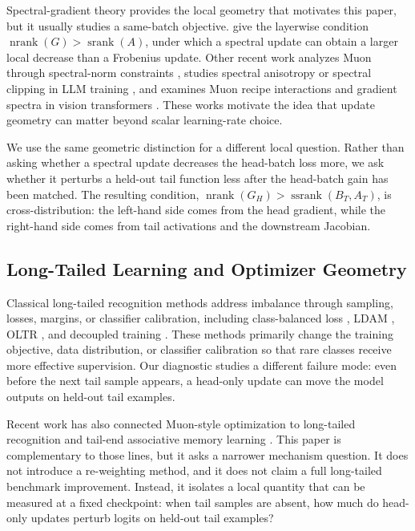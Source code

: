 \documentclass{article}
\theoremstyle{definition}
\newcommand{\srank}{\operatorname{srank}}
\newcommand{\nrank}{\operatorname{nrank}}
\newcommand{\ssrank}{\operatorname{ssrank}}
\begin{document}
Spectral-gradient theory provides the local geometry that motivates this paper, but it usually studies a same-batch objective. \citet{davis2025spectral} give the layerwise condition \(\nrank(G)>\srank(A)\), under which a spectral update can obtain a larger local decrease than a Frobenius update. Other recent work analyzes Muon through spectral-norm constraints \citep{chen2025muon}, studies spectral anisotropy or spectral clipping in LLM training \citep{spectra2026,spectralclipping2026}, and examines Muon recipe interactions and gradient spectra in vision transformers \citep{muonvit2026}. These works motivate the idea that update geometry can matter beyond scalar learning-rate choice.

We use the same geometric distinction for a different local question. Rather than asking whether a spectral update decreases the head-batch loss more, we ask whether it perturbs a held-out tail function less after the head-batch gain has been matched. The resulting condition, \(\nrank(G_H)>\ssrank(B_T,A_T)\), is cross-distribution: the left-hand side comes from the head gradient, while the right-hand side comes from tail activations and the downstream Jacobian.

\subsection{Long-Tailed Learning and Optimizer Geometry}

Classical long-tailed recognition methods address imbalance through sampling, losses, margins, or classifier calibration, including class-balanced loss \citep{cui2019classbalanced}, LDAM \citep{cao2019ldam}, OLTR \citep{liu2019oltr}, and decoupled training \citep{kang2020decoupling}. These methods primarily change the training objective, data distribution, or classifier calibration so that rare classes receive more effective supervision. Our diagnostic studies a different failure mode: even before the next tail sample appears, a head-only update can move the model outputs on held-out tail examples.

Recent work has also connected Muon-style optimization to long-tailed recognition \citep{promo2026} and tail-end associative memory learning \citep{muonmemory2025}. This paper is complementary to those lines, but it asks a narrower mechanism question. It does not introduce a re-weighting method, and it does not claim a full long-tailed benchmark improvement. Instead, it isolates a local quantity that can be measured at a fixed checkpoint: when tail samples are absent, how much do head-only updates perturb logits on held-out tail examples?
\end{document}
